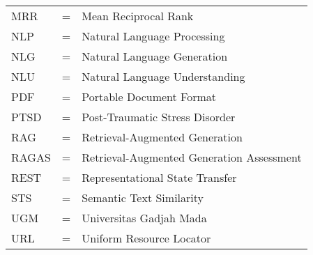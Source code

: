 \begin{tabular}{llp{3in}}
	MRR     & \hspace{1.5cm} = & Mean Reciprocal Rank                                         \\
	NLP     & \hspace{1.5cm} = & Natural Language Processing                                  \\
	NLG     & \hspace{1.5cm} = & Natural Language Generation                                  \\
	NLU     & \hspace{1.5cm} = & Natural Language Understanding                               \\
	PDF     & \hspace{1.5cm} = & Portable Document Format                                     \\
	PTSD    & \hspace{1.5cm} = & Post-Traumatic Stress Disorder                               \\
	RAG     & \hspace{1.5cm} = & Retrieval-Augmented Generation                               \\
	RAGAS   & \hspace{1.5cm} = & Retrieval-Augmented Generation Assessment                    \\
	REST    & \hspace{1.5cm} = & Representational State Transfer                              \\
	STS     & \hspace{1.5cm} = & Semantic Text Similarity                                     \\
	UGM     & \hspace{1.5cm} = & Universitas Gadjah Mada                                      \\
	URL     & \hspace{1.5cm} = & Uniform Resource Locator                                     \\
\end{tabular}
